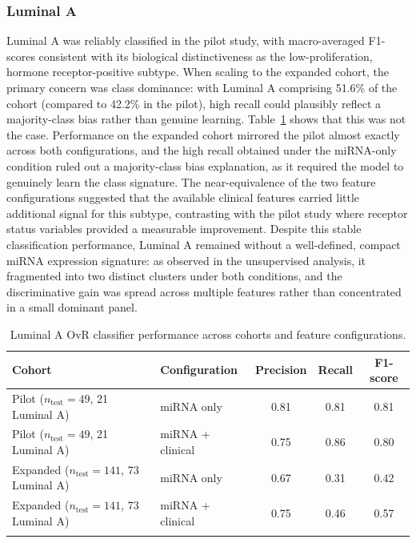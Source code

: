 \subsubsection{Luminal A}

Luminal A was reliably classified in the pilot study, with macro-averaged F1-scores
consistent with its biological distinctiveness as the low-proliferation,
hormone receptor-positive subtype. When scaling to the expanded cohort, the
primary concern was class dominance: with Luminal A comprising 51.6\% of the
cohort (compared to 42.2\% in the pilot), high recall could plausibly reflect a
majority-class bias rather than genuine learning. Table~\ref{tab:luma_expanded}
shows that this was not the case. Performance on the expanded cohort mirrored the
pilot almost exactly across both configurations, and the high recall obtained under
the miRNA-only condition ruled out a majority-class bias explanation, as it required
the model to genuinely learn the class signature. The near-equivalence of the two
feature configurations suggested that the available clinical features carried little
additional signal for this subtype, contrasting with the pilot study where receptor
status variables provided a measurable improvement. Despite this stable classification
performance, Luminal A remained without a well-defined, compact miRNA
expression signature: as observed in the unsupervised analysis, it fragmented into
two distinct clusters under both conditions, and the discriminative gain was spread
across multiple features rather than concentrated in a small dominant panel.

\begin{table}[!ht]
    \centering
    \caption{Luminal A OvR classifier performance across cohorts and feature configurations.}
    \begin{tabular}{llccc}
    \toprule
    \textbf{Cohort} & \textbf{Configuration} & \textbf{Precision} & \textbf{Recall} & \textbf{F1-score} \\
    \midrule
    Pilot ($n_{\text{test}}=49$, 21 Luminal A)      & miRNA only         & 0.81 & 0.81 & 0.81 \\
    Pilot ($n_{\text{test}}=49$, 21 Luminal A)      & miRNA + clinical   & 0.75  & 0.86  & 0.80  \\
    \midrule
    Expanded ($n_{\text{test}}=141$, 73 Luminal A) & miRNA only         & 0.67 & 0.31 & 0.42 \\
    Expanded ($n_{\text{test}}=141$, 73 Luminal A) & miRNA + clinical   & 0.75 & 0.46 & 0.57 \\
    \bottomrule
    \label{tab:luma_expanded}
    \end{tabular}
    \end{table}

